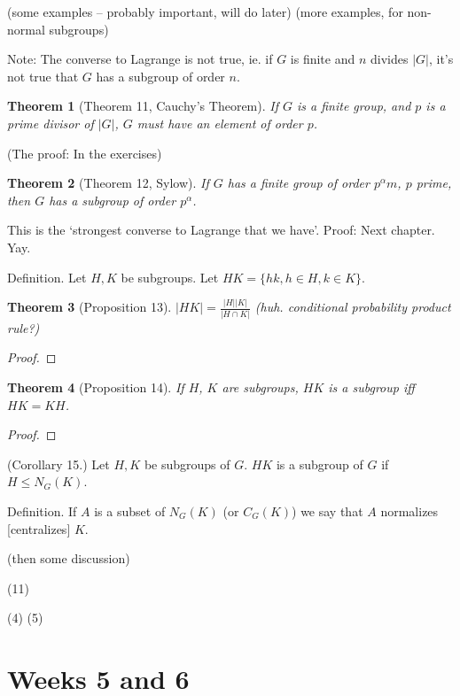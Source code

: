 \documentclass[1    0pt, answers]{exam} \renewcommand{\baselinestretch}{1.05}
\theoremstyle{plain}
\newtheorem{theorem}{Theorem}
\theoremstyle{definition}
\begin{document}
\begin{questions}
(some examples -- probably important, will do later)
(more examples, for non-normal subgroups)

Note: The converse to Lagrange is not true, ie. if $G$ is finite and $n$ divides $|G|$, it's not true that $G$ has a subgroup of order $n$.

\begin{theorem}[Theorem 11, Cauchy's Theorem]
If $G$ is a finite group, and $p$ is a prime divisor of $|G|$, $G$ must have an element of order $p$.
\end{theorem}
(The proof: In the exercises)

\begin{theorem}[Theorem 12, Sylow]
If $G$ has a finite group of order $p^{\alpha}m$, $p$ prime, then $G$ has a subgroup of order $p^{\alpha}$.
\end{theorem}
This is the `strongest converse to Lagrange that we have'. Proof: Next chapter. Yay.

Definition. Let $H,K$ be subgroups. Let $HK = \{ hk, h \in H, k \in K \}$.

\begin{theorem}[Proposition 13]
$|HK| = \frac{|H||K|}{|H \cap K|}$ (huh. conditional probability product rule?)
\end{theorem}
\begin{proof}
\end{proof}

\begin{theorem}[Proposition 14]
If $H$, $K$ are subgroups, $HK$ is a subgroup iff $HK = KH$.
\end{theorem}
\begin{proof}
\end{proof}

(Corollary 15.) Let $H,K$ be subgroups of $G$. $HK$ is a subgroup of $G$ if $H \leq N_G(K)$. 

Definition. If $A$ is a subset of $N_G(K)$ (or $C_G(K)$) we say that $A$ normalizes [centralizes] $K$.

(then some discussion)

\question (11)

\question (4)
\question (5)


\end{questions}

\section{Weeks 5 and 6}
\end{document}
